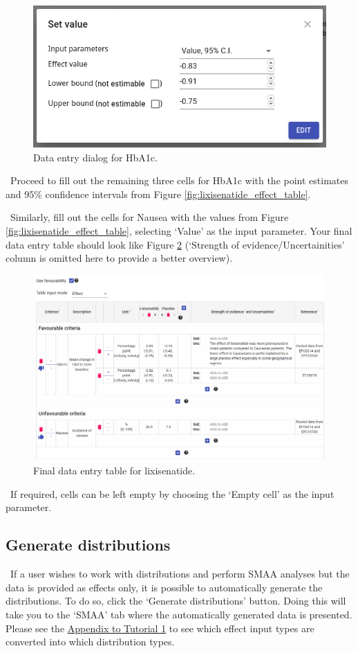 \documentclass[00_mcda_tutorial.tex]{subfiles}
\begin{document}
\begin{figure}[!h]
    \centering
    \includegraphics[width=.5\textwidth]{fig/effectsInput.png}
    \caption{Data entry dialog for HbA1c.}
    \label{fig:data1}
\end{figure}

\noindent \leftpointright \, Proceed to fill out the remaining three cells for HbA1c with the point estimates and 95\% confidence intervals from Figure \ref{fig:lixisenatide_effect_table}.
\newline

\noindent \leftpointright \, Similarly, fill out the cells for Nausea with the values from Figure \ref{fig:lixisenatide_effect_table}, selecting ‘Value’ as the input parameter. Your final data entry table should look like Figure \ref{fig:dataFinished} (‘Strength of evidence/Uncertainities’ column is omitted here to provide a better overview).

\begin{figure}[!h]
    \centering
    \includegraphics[width=\textwidth]{fig/effectsInputDone.png}
    \caption{Final data entry table for lixisenatide.}
    \label{fig:dataFinished}
\end{figure}

\noindent \faLightbulbO \, If required, cells can be left empty by choosing the ‘Empty cell’ as the input parameter.

\subsection*{Generate distributions}
\noindent \leftpointright \, If a user wishes to work with distributions and perform SMAA analyses but the data is provided as effects only, it is possible to automatically generate the distributions. To do so, click the ‘Generate distributions’ button. Doing this will take you to the ‘SMAA’ tab where the automatically generated data is presented. Please see the \hyperref[appendix1]{Appendix to Tutorial 1} to see which effect input types are converted into which distribution types.
\end{document}
